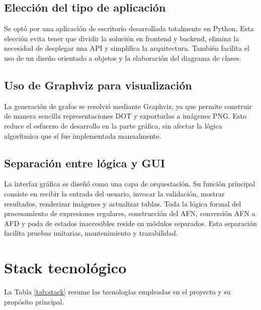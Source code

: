 \documentclass[12pt]{article}
\begin{document}
\subsection{Elección del tipo de aplicación}

Se optó por una aplicación de escritorio desarrollada totalmente en Python. Esta elección evita tener que dividir la solución en frontend y backend, elimina la necesidad de desplegar una API y simplifica la arquitectura. También facilita el uso de un diseño orientado a objetos y la elaboración del diagrama de clases.

\subsection{Uso de Graphviz para visualización}

La generación de grafos se resolvió mediante Graphviz, ya que permite construir de manera sencilla representaciones DOT y exportarlas a imágenes PNG. Esto reduce el esfuerzo de desarrollo en la parte gráfica, sin afectar la lógica algorítmica que sí fue implementada manualmente.

\subsection{Separación entre lógica y GUI}

La interfaz gráfica se diseñó como una capa de orquestación. Su función principal consiste en recibir la entrada del usuario, invocar la validación, mostrar resultados, renderizar imágenes y actualizar tablas. Toda la lógica formal del procesamiento de expresiones regulares, construcción del AFN, conversión AFN a AFD y poda de estados inaccesibles reside en módulos separados. Esta separación facilita pruebas unitarias, mantenimiento y trazabilidad.

\section{Stack tecnológico}

La Tabla \ref{tab:stack} resume las tecnologías empleadas en el proyecto y su propósito principal.
\end{document}
